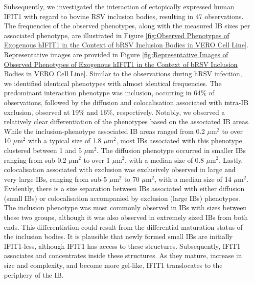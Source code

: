 Subsequently, we investigated the interaction of ectopically expressed human IFIT1 with regard to bovine RSV inclusion bodies, resulting in 47 observations. The frequencies of the observed phenotypes, along with the measured IB sizes per associated phenotype, are illustrated in Figure \ref{fig:Observed Phenotypes of Exogenous hIFIT1 in the Context of bRSV Inclusion Bodies in VERO Cell Line}. Representative images are provided in Figure \ref{fig:Representative Images of Observed Phenotypes of Exogenous hIFIT1 in the Context of bRSV Inclusion Bodies in VERO Cell Line}. Similar to the observations during hRSV infection, we identified identical phenotypes with almost identical frequencies. The predominant interaction phenotype was inclusion, occurring in 64\% of observations, followed by the diffusion and colocalisation associated with intra-IB exclusion, observed at 19\% and 16\%, respectively. Notably, we observed a relatively clear differentiation of the phenotypes based on the associated IB areas. While the inclusion-phenotype associated IB areas ranged from 0.2 \(\mu \mbox{m}^2\) to over 10 \(\mu \mbox{m}^2\) with a typical size of 1.8 \(\mu \mbox{m}^2\), most IBs associated with this phenotype clustered between 1 and 5 \(\mu \mbox{m}^2\). The diffusion phenotype occurred in smaller IBs ranging from sub-0.2 \(\mu \mbox{m}^2\) to over 1 \(\mu \mbox{m}^2\), with a median size of 0.8 \(\mu \mbox{m}^2\). Lastly, colocalisation associated with exclusion was exclusively observed in large and very large IBs, ranging from sub-5 \(\mu \mbox{m}^2\) to 70 \(\mu \mbox{m}^2\), with a median size of 14 \(\mu \mbox{m}^2\). Evidently, there is a size separation between IBs associated with either diffusion (small IBs) or colocalisation accompanied by exclusion (large IBs) phenotypes. The inclusion phenotype was most commonly observed in IBs with sizes between these two groups, although it was also observed in extremely sized IBs from both ends. This differentiation could result from the differential maturation status of the inclusion bodies. It is plausible that newly formed small IBs are initially IFIT1-less, although IFIT1 has access to these structures. Subsequently, IFIT1 associates and concentrates inside these structures. As they mature, increase in size and complexity, and become more gel-like, IFIT1 translocates to the periphery of the IB.


